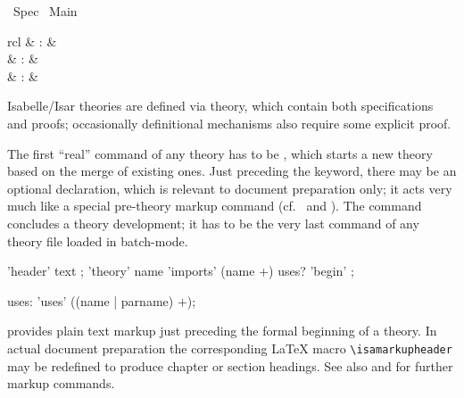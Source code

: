 %
\begin{isabellebody}%
\def\isabellecontext{Spec}%
%
\isadelimtheory
\isanewline
\isanewline
%
\endisadelimtheory
%
\isatagtheory
{}\isamarkupfalse%
\ Spec\isanewline
{}\ Main\isanewline
{}%
\endisatagtheory
{\isafoldtheory}%
%
\isadelimtheory
%
\endisadelimtheory
%
\isamarkuptrue%
%
\isamarkuptrue%
%
\begin{isamarkuptext}%
\begin{matharray}{rcl}
    \mbox{} & : &  \\
    \mbox{} & : &  \\
    \mbox{} & : &  \\
  \end{matharray}

  Isabelle/Isar theories are defined via theory, which contain both
  specifications and proofs; occasionally definitional mechanisms also
  require some explicit proof.

  The first ``real'' command of any theory has to be \mbox{}, which starts a new theory based on the merge of existing
  ones.  Just preceding the \mbox{} keyword, there may be
  an optional \mbox{} declaration, which is relevant to
  document preparation only; it acts very much like a special
  pre-theory markup command (cf.\  and
  ).  The \mbox{} command concludes a
  theory development; it has to be the very last command of any theory
  file loaded in batch-mode.

  \begin{rail}
    'header' text
    ;
    'theory' name 'imports' (name +) uses? 'begin'
    ;

    uses: 'uses' ((name | parname) +);
  \end{rail}

  \begin{descr}

  \item [\mbox{\isa{\isacommand{header}}}~\isa{{\isachardoublequote}text{\isachardoublequote}}] provides plain text
  markup just preceding the formal beginning of a theory.  In actual
  document preparation the corresponding {\LaTeX} macro \verb|\isamarkupheader| may be redefined to produce chapter or section
  headings.  See also  and
   for further markup commands.
  

\end{descr}
\end{isamarkuptext}
\end{isabellebody}
